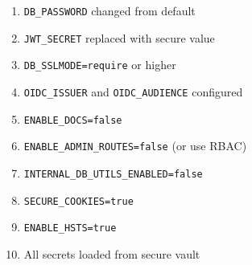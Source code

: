 \begin{enumerate}
    \item \texttt{DB\_PASSWORD} changed from default
    \item \texttt{JWT\_SECRET} replaced with secure value
    \item \texttt{DB\_SSLMODE=require} or higher
    \item \texttt{OIDC\_ISSUER} and \texttt{OIDC\_AUDIENCE} configured
    \item \texttt{ENABLE\_DOCS=false}
    \item \texttt{ENABLE\_ADMIN\_ROUTES=false} (or use RBAC)
    \item \texttt{INTERNAL\_DB\_UTILS\_ENABLED=false}
    \item \texttt{SECURE\_COOKIES=true}
    \item \texttt{ENABLE\_HSTS=true}
    \item All secrets loaded from secure vault
\end{enumerate}

